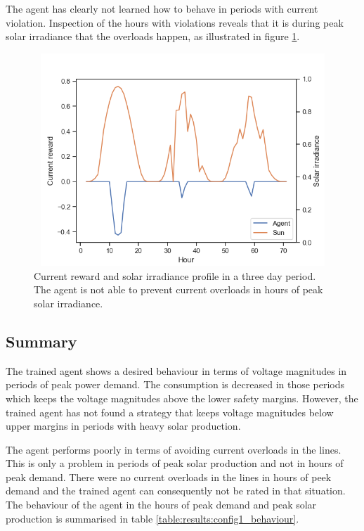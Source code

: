 \documentclass[class=book, crop=false]{standalone}
\begin{document}
The agent has clearly not learned how to behave in periods with current violation. Inspection of the hours with violations reveals that it is during peak solar irradiance that the overloads happen, as illustrated in figure \ref{fig:results:config1_bad_current}.


\begin{figure}[H]
    \center
\includegraphics[height=8cm, width=12cm]{figures/config1_bad_current.png}
    \caption[size = 9]{Current reward and solar irradiance profile in a three day period. The agent is not able to prevent current overloads in hours of peak solar irradiance.}
    \label{fig:results:config1_bad_current}
\end{figure}

\subsection{Summary}
The trained agent shows a desired behaviour in terms of voltage magnitudes in periods of peak power demand. The consumption is decreased in those periods which keeps the voltage magnitudes above the lower safety margins. However, the trained agent has not found a strategy that keeps voltage magnitudes below upper margins in periods with heavy solar production.

The agent performs poorly in terms of avoiding current overloads in the lines. This is only a problem in periods of peak solar production and not in hours of peak demand. There were no current overloads in the lines in hours of peek demand and the trained agent can consequently not be rated in that situation. The behaviour of the agent in the hours of peak demand and peak solar production is summarised in table \ref{table:results:config1_behaviour}.
\end{document}
